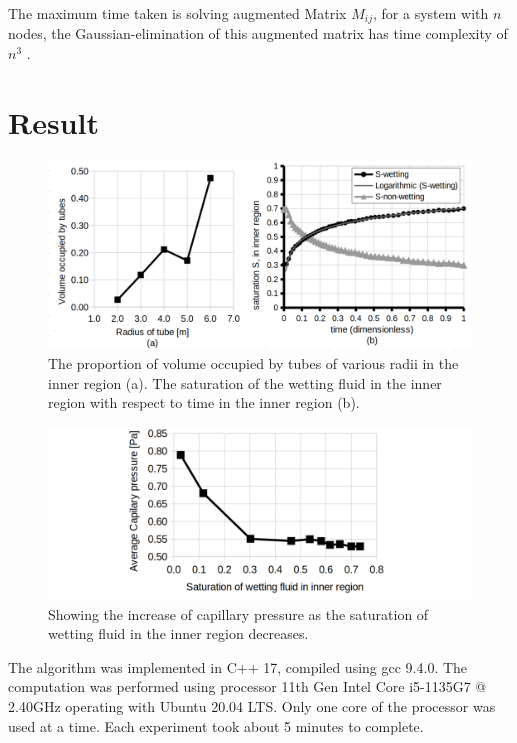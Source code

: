 \documentclass[
	12pt
] {article}
\begin{document}
The maximum time taken is solving augmented Matrix $M_{ij}$, for a system with $n$ nodes, the Gaussian-elimination of this augmented matrix has time complexity of $n^3$ \cite{farebrother2018linear}.

\section{Result}

	\begin{figure}
		\centering
		\includegraphics[width=\textwidth]{fig_4_2200x1000}
		\caption{The proportion of volume occupied by tubes of various radii in the inner region (a). The saturation of the wetting fluid in the inner region with respect to time in the inner region (b).}
		\label{fig:4}
	\end{figure}
	
	\begin{figure}
		\centering
		\includegraphics[width=\textwidth]{fig_5_2200x900}
		\caption{Showing the increase of capillary pressure as the saturation of wetting fluid in the inner region decreases.}
		\label{fig:5}
	\end{figure}
	
	
	The algorithm was implemented in C++ 17, compiled using gcc 9.4.0. The computation was performed using processor 11th Gen Intel Core i5-1135G7 @ 2.40GHz operating with Ubuntu 20.04 LTS. Only one core of the processor was used at a time. Each experiment took about 5 minutes to complete.
	
\end{document}
